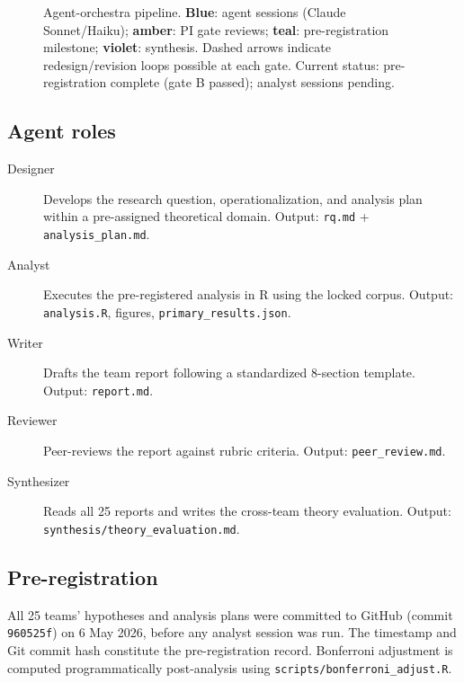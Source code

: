 \documentclass[12pt,a4paper]{article}
\begin{document}
\begin{figure}[ht]

\caption{Agent-orchestra pipeline. \textbf{Blue}: agent sessions (Claude Sonnet/Haiku);
\textbf{amber}: PI gate reviews; \textbf{teal}: pre-registration milestone;
\textbf{violet}: synthesis. Dashed arrows indicate redesign/revision loops possible at each gate.
Current status: pre-registration complete (gate B passed); analyst sessions pending.}
\label{fig:pipeline}
\end{figure}

\subsection{Agent roles}

\begin{description}
  \item[Designer] Develops the research question, operationalization, and
    analysis plan within a pre-assigned theoretical domain.
    Output: \texttt{rq.md} + \texttt{analysis\_plan.md}.
  \item[Analyst] Executes the pre-registered analysis in R using the locked
    corpus. Output: \texttt{analysis.R}, figures, \texttt{primary\_results.json}.
  \item[Writer] Drafts the team report following a standardized 8-section template.
    Output: \texttt{report.md}.
  \item[Reviewer] Peer-reviews the report against rubric criteria.
    Output: \texttt{peer\_review.md}.
  \item[Synthesizer] Reads all 25 reports and writes the cross-team theory
    evaluation. Output: \texttt{synthesis/theory\_evaluation.md}.
\end{description}

\subsection{Pre-registration}

All 25 teams' hypotheses and analysis plans were committed to GitHub
(commit \texttt{960525f}) on 6 May 2026, before any analyst session was run.
The timestamp and Git commit hash constitute the pre-registration record.
Bonferroni adjustment is computed programmatically post-analysis using
\texttt{scripts/bonferroni\_adjust.R}.
\end{document}
